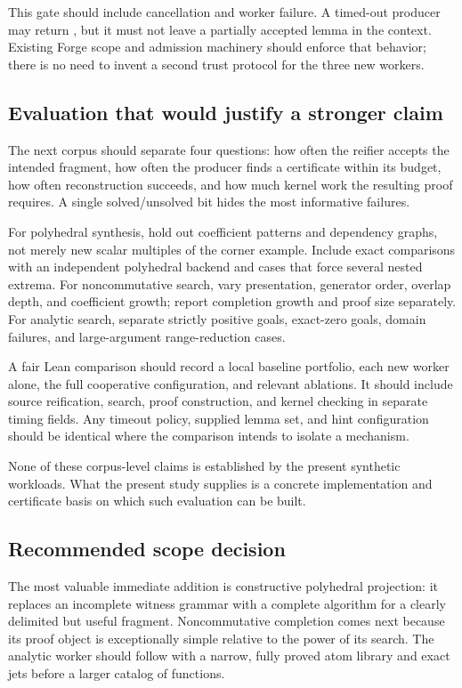 This gate should include cancellation and worker failure. A timed-out producer may return \unknown{}, but it must not leave a partially accepted lemma in the context. Existing Forge scope and admission machinery should enforce that behavior; there is no need to invent a second trust protocol for the three new workers.

\subsection{Evaluation that would justify a stronger claim}
The next corpus should separate four questions: how often the reifier accepts the intended fragment, how often the producer finds a certificate within its budget, how often reconstruction succeeds, and how much kernel work the resulting proof requires. A single solved/unsolved bit hides the most informative failures.

For polyhedral synthesis, hold out coefficient patterns and dependency graphs, not merely new scalar multiples of the corner example. Include exact comparisons with an independent polyhedral backend and cases that force several nested extrema. For noncommutative search, vary presentation, generator order, overlap depth, and coefficient growth; report completion growth and proof size separately. For analytic search, separate strictly positive goals, exact-zero goals, domain failures, and large-argument range-reduction cases.

A fair Lean comparison should record a local baseline portfolio, each new worker alone, the full cooperative configuration, and relevant ablations. It should include source reification, search, proof construction, and kernel checking in separate timing fields. Any timeout policy, supplied lemma set, and hint configuration should be identical where the comparison intends to isolate a mechanism.

None of these corpus-level claims is established by the present synthetic workloads. What the present study supplies is a concrete implementation and certificate basis on which such evaluation can be built.

\subsection{Recommended scope decision}
The most valuable immediate addition is constructive polyhedral projection: it replaces an incomplete witness grammar with a complete algorithm for a clearly delimited but useful fragment. Noncommutative completion comes next because its proof object is exceptionally simple relative to the power of its search. The analytic worker should follow with a narrow, fully proved atom library and exact jets before a larger catalog of functions.

